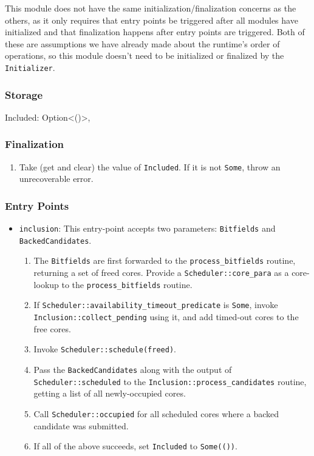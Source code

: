 This module does not have the same initialization/finalization concerns as the
others, as it only requires that entry points be triggered after all modules
have initialized and that finalization happens after entry points are triggered.
Both of these are assumptions we have already made about the runtime's order of
operations, so this module doesn't need to be initialized or finalized by the
\verb|Initializer|.

\subsubsection{Storage}

\begin{verbnobox}
Included: Option<()>,
\end{verbnobox}

\subsubsection{Finalization}

\begin{enumerate}
    \item Take (get and clear) the value of \verb|Included|. If it is not
    \verb|Some|, throw an unrecoverable error.
\end{enumerate}

\subsubsection{Entry Points}

\begin{itemize}
    \item \verb|inclusion|: This entry-point accepts two parameters: \verb|Bitfields| and
    \verb|BackedCandidates|.
    \begin{enumerate}
        \item The \verb|Bitfields| are first forwarded to the
        \verb|process_bitfields| routine, returning a set of freed cores.
        Provide a \verb|Scheduler::core_para| as a core-lookup to the
        \verb|process_bitfields| routine.
        \item If \verb|Scheduler::availability_timeout_predicate| is
        \verb|Some|, invoke \verb|Inclusion::collect_pending| using it, and add
        timed-out cores to the free cores.
        \item Invoke \verb|Scheduler::schedule(freed)|.
        \item Pass the \verb|BackedCandidates| along with the output of
        \verb|Scheduler::scheduled| to the \verb|Inclusion::process_candidates|
        routine, getting a list of all newly-occupied cores.
        \item Call \verb|Scheduler::occupied| for all scheduled cores where a
        backed candidate was submitted.
        \item If all of the above succeeds, set \verb|Included| to
        \verb|Some(())|.
    \end{enumerate}
\end{itemize}

